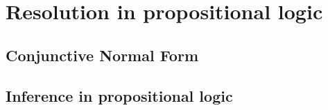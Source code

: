 \section{Resolution in propositional logic}
\subsection{Conjunctive Normal Form}
\begin{large}
    
\end{large}


\subsection{Inference in propositional logic}
\begin{large}
    
\end{large}